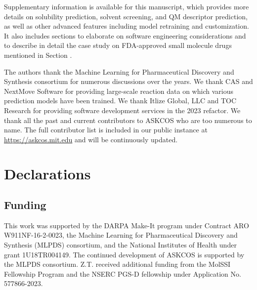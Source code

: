 \documentclass[pdflatex,sn-mathphys-num]{sn-jnl}%
\theoremstyle{thmstyleone}%
\theoremstyle{thmstyletwo}%
\theoremstyle{thmstylethree}%
\begin{document}
\backmatter





Supplementary information is available for this manuscript, which provides more details on solubility prediction, solvent screening, and QM descriptor prediction, as well as other advanced features including model retraining and customization. It also includes sections to elaborate on software engineering considerations and to describe in detail the case study on FDA-approved small molecule drugs mentioned in Section .


The authors thank the Machine Learning for Pharmaceutical Discovery and Synthesis consortium for numerous discussions over the years. We thank CAS and NextMove Software for providing large-scale reaction data on which various prediction models have been trained. We thank Itlize Global, LLC and TOC Research for providing software development services in the 2023 refactor. We thank all the past and current contributors to ASKCOS who are too numerous to name. The full contributor list is included in our public instance at \href{https://askcos.mit.edu}{https://askcos.mit.edu} and will be continuously updated.


\section*{Declarations}

\subsection{Funding}

This work was supported by the DARPA Make-It program under Contract ARO W911NF-16-2-0023, the Machine Learning for Pharmaceutical Discovery and Synthesis (MLPDS) consortium, and the National Institutes of Health under grant 1U18TR004149. The continued development of ASKCOS is supported by the MLPDS consortium. Z.T. received additional funding from the MolSSI Fellowship Program and the NSERC PGS-D fellowship under Application No. 577866-2023.
\end{document}
